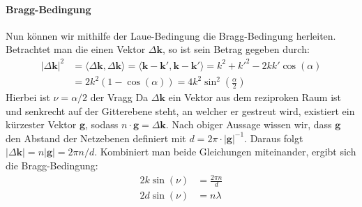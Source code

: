 \paragraph{Bragg-Bedingung}
Nun können wir mithilfe der Laue-Bedingung die Bragg-Bedingung herleiten.
Betrachtet man die einen Vektor $\Delta \mathbf{k}$, so ist sein Betrag gegeben durch:
\begin{align*}
    \lvert \Delta \mathbf{k} \rvert ^{2}&=\langle \Delta \mathbf{k} ,\Delta \mathbf{k}\rangle =\langle \mathbf{k}-\mathbf{k}', \mathbf{k}-\mathbf{k}' \rangle = k^{2}+k'^{2}-2kk'\cos(\alpha)  \\
    &=2{k}^{2}(1-\cos(\alpha))=4k^{2}\sin ^{2}\left( \frac{\alpha}{2} \right)
\end{align*}
Hierbei ist $\nu = \alpha / 2$ der Vragg
Da $\Delta \mathbf{k}$ ein Vektor aus dem reziproken Raum ist und senkrecht auf der Gitterebene
steht, an welcher er gestreut wird, existiert ein kürzester Vektor $\mathbf{g}$, sodass
$n\cdot \mathbf{g} =\Delta \mathbf{k}$.
Nach obiger Aussage wissen wir, dass $\mathbf{g}$ den Abstand der Netzebenen definiert
mit $d = 2 \pi \cdot\lvert \mathbf{g} \rvert ^{-1}$.
Daraus folgt $\lvert \Delta \mathbf{k} \rvert=n \lvert \mathbf{g} \rvert = 2\pi n/d$.
Kombiniert man beide Gleichungen miteinander, ergibt sich die Bragg-Bedingung:
\begin{align*}
    2k\sin(\nu)&=\frac{2\pi n}{d} \\
    2d\sin(\nu)&=n \lambda
\end{align*}
